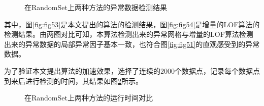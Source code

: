 \begin{figure}[htbp]
{\begin{minipage}{7cm}
		\end{minipage}
	}\caption{在RandomSet上两种方法的异常数据检测结果} %
	\label{fig:fig534}                                       %
\end{figure}

其中，图\ref{fig:fig53}是本文提出的算法的检测结果，图\ref{fig:fig54}是增量的LOF算法的检测结果。由两图对比可知，本算法检测出来的异常网格与增量的LOF算法检测出来的异常数据的局部异常因子基本一致，也符合图\ref{fig:fig51}的直观感受到的异常数据。

为了验证本文提出算法的加速效果，选择了连续的$2000$个数据点，记录每个数据点到来后进行检测的时间，其结果如图\ref{fig:fig55}所示。
\begin{figure}[htbp]
	\centering                                      %
	\caption{在RandomSet上两种方法的运行时间对比} %
	\label{fig:fig55}                                       %
\end{figure}
